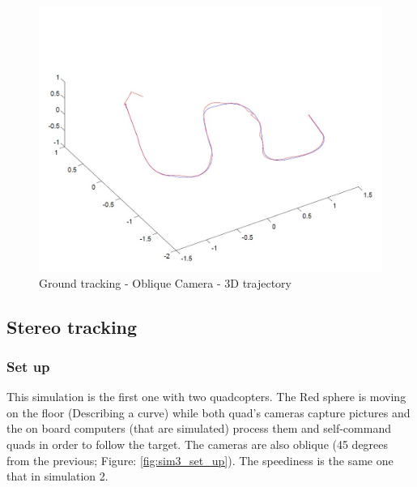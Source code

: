 \begin{figure}[h]
\centering
\includegraphics[width=0.7\linewidth]{../Images/c3/sim2_traj_both_3d}
\caption{Ground tracking - Oblique Camera - 3D trajectory}
\label{fig:sim2_traj_both_3d}
\end{figure}




\subsection{Stereo tracking}
\subsubsection{Set up}
This simulation is the first one with two quadcopters. The Red sphere is moving on the floor (Describing a curve) while both quad's cameras capture pictures and the on board computers (that are simulated) process them and self-command quads in order to follow the target. The cameras are also oblique (45 degrees from the previous; Figure: \ref{fig:sim3_set_up}). The speediness is the same one that in simulation 2.

